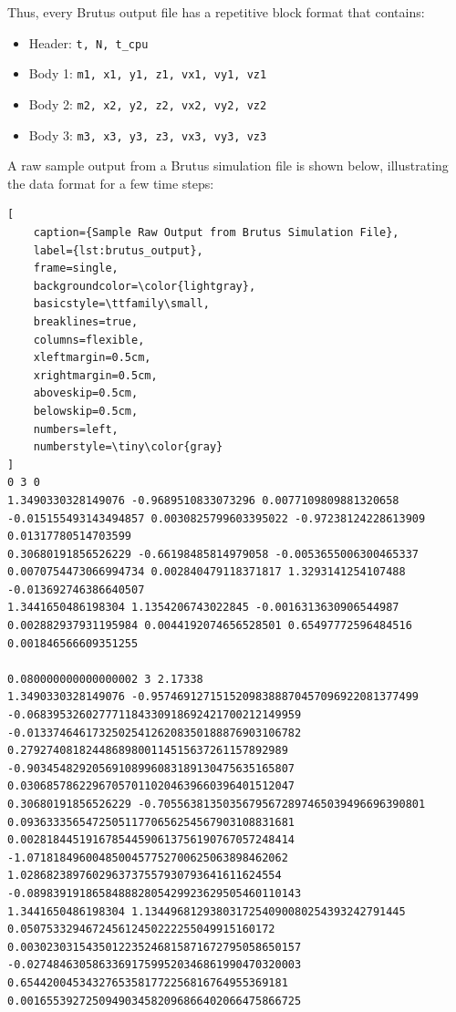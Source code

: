 \documentclass{article}
\begin{document}
Thus, every Brutus output file has a repetitive block format that contains:
\begin{itemize}
    \item Header: \texttt{t, N, t\_cpu}
    \item Body 1: \texttt{m1, x1, y1, z1, vx1, vy1, vz1}
    \item Body 2: \texttt{m2, x2, y2, z2, vx2, vy2, vz2}
    \item Body 3: \texttt{m3, x3, y3, z3, vx3, vy3, vz3}
\end{itemize}

A raw sample output from a Brutus simulation file is shown below, illustrating the data format for a few time steps:

\begin{lstlisting}[
    caption={Sample Raw Output from Brutus Simulation File},
    label={lst:brutus_output},
    frame=single,
    backgroundcolor=\color{lightgray},
    basicstyle=\ttfamily\small,
    breaklines=true,
    columns=flexible,
    xleftmargin=0.5cm,
    xrightmargin=0.5cm,
    aboveskip=0.5cm,
    belowskip=0.5cm,
    numbers=left,
    numberstyle=\tiny\color{gray}
]
0 3 0
1.3490330328149076 -0.9689510833073296 0.0077109809881320658 -0.015155493143494857 0.0030825799603395022 -0.97238124228613909 0.01317780514703599
0.30680191856526229 -0.66198485814979058 -0.0053655006300465337 0.0070754473066994734 0.002840479118371817 1.3293141254107488 -0.013692746386640507
1.3441650486198304 1.1354206743022845 -0.0016313630906544987 0.002882937931195984 0.0044192074656528501 0.65497772596484516 0.001846566609351255

0.080000000000000002 3 2.17338
1.3490330328149076 -0.95746912715152098388870457096922081377499 -0.068395326027771184330918692421700212149959 -0.013374646173250254126208350188876903106782 0.27927408182448689800114515637261157892989 -0.90345482920569108996083189130475635165807 0.030685786229670570110204639660396401512047
0.30680191856526229 -0.70556381350356795672897465039496696390801 0.093633356547250511770656254567903108831681 0.002818445191678544590613756190767057248414 -1.0718184960048500457752700625063898462062 1.0286823897602963737557930793641611624554 -0.089839191865848882805429923629505460110143
1.3441650486198304 1.1344968129380317254090080254393242791445 0.050753329467245612450222255049915160172 0.0030230315435012235246815871672795058650157 -0.027484630586336917599520346861990470320003 0.65442004534327653581772256816764955369181 0.0016553927250949034582096866402066475866725
\end{lstlisting}
\end{document}
